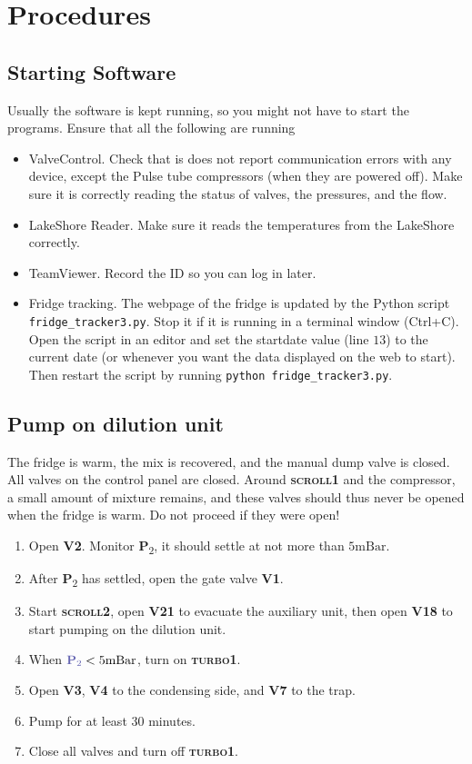 \documentclass{article}[18pt,A4]
\newcommand{\mBar}{\mathrm{mBar}}
\newcommand{\thing}[1]{{\color{gray}\textsc{ \textbf{#1}}}}
\newcommand{\valve}[1]{{\color{gray}\textbf{V#1}}}
\newcommand{\pressure}[1]{{\color{pressurecolor}\textbf{P}\textsubscript{#1}}}
\begin{document}
\section{Procedures}

\subsection{Starting Software}
Usually the software is kept running, so you might not have to start the programs.
Ensure that all the following are running
\begin{itemize}
    \item ValveControl.
    Check that is does not report communication errors with any device,
    except the Pulse tube compressors (when they are powered off).
    Make sure it is correctly reading the status of valves, the pressures, and the flow.
    \item LakeShore Reader.
    Make sure it reads the temperatures from the LakeShore correctly.
    \item TeamViewer. Record the ID so you can log in later.
    \item Fridge tracking. The webpage of the fridge is updated by the Python script
    \texttt{fridge\_tracker3.py}. Stop it if it is running in a terminal window (Ctrl+C).
    Open the script in an editor and set the startdate value (line $13$) to the current
    date (or whenever you want the data displayed on the web to start).
    Then restart the script by running \texttt{python fridge\_tracker3.py}.
\end{itemize}

\subsection{Pump on dilution unit}
The fridge is warm, the mix is recovered, and the manual dump valve is closed.
All valves on the control panel are closed.
Around \thing{scroll1} and the compressor, a small amount of mixture remains, and these valves should thus never be opened when the fridge is warm.
Do not proceed if they were open!
\begin{enumerate}
    \item Open \valve{2}. Monitor \pressure{2}, it should settle at not more than $5 \mBar$.
    \item After \pressure{2} has settled, open the gate valve \valve{1}.
    \item Start \thing{scroll2}, open \valve{21} to evacuate the auxiliary unit, then open \valve{18} to start pumping on the dilution unit.
    \item When $\pressure{2} < 5 \mBar$, turn on \thing{turbo1}.
    \item Open \valve{3}, \valve{4} to the condensing side, and \valve{7} to the trap.
    \item Pump for at least 30 minutes.
    \item Close all valves and turn off \thing{turbo1}.
\end{enumerate}
\end{document}
